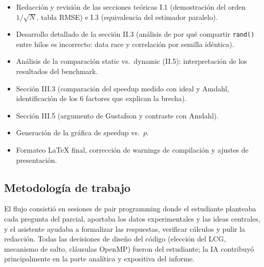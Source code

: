 \documentclass[12pt,a4paper]{article}
\begin{document}
\begin{itemize}
  \item Redacci\'on y revisi\'on de las secciones te\'oricas I.1 (demostraci\'on del orden $1/\sqrt{N}$, tabla RMSE) e I.3 (equivalencia del estimador paralelo).
  \item Desarrollo detallado de la secci\'on II.3 (an\'alisis de por qu\'e compartir \texttt{rand()} entre hilos es incorrecto: data race y correlaci\'on por semilla id\'entica).
  \item An\'alisis de la comparaci\'on static vs.\ dynamic (II.5): interpretaci\'on de los resultados del benchmark.
  \item Secci\'on III.3 (comparaci\'on del speedup medido con ideal y Amdahl, identificaci\'on de los 6 factores que explican la brecha).
  \item Secci\'on III.5 (argumento de Gustafson y contraste con Amdahl).
  \item Generaci\'on de la gr\'afica de speedup vs.\ $p$.
  \item Formateo \LaTeX{} final, correcci\'on de warnings de compilaci\'on y ajustes de presentaci\'on.
\end{itemize}

\subsection*{Metodolog\'ia de trabajo}

El flujo consisti\'o en sesiones de pair programming donde el estudiante planteaba cada pregunta del parcial, aportaba los datos experimentales y las ideas centrales, y el asistente ayudaba a formalizar las respuestas, verificar c\'alculos y pulir la redacci\'on. Todas las decisiones de dise\~no del c\'odigo (elecci\'on del LCG, mecanismo de salto, cl\'ausulas OpenMP) fueron del estudiante; la IA contribuy\'o principalmente en la parte anal\'itica y expositiva del informe.
\end{document}
